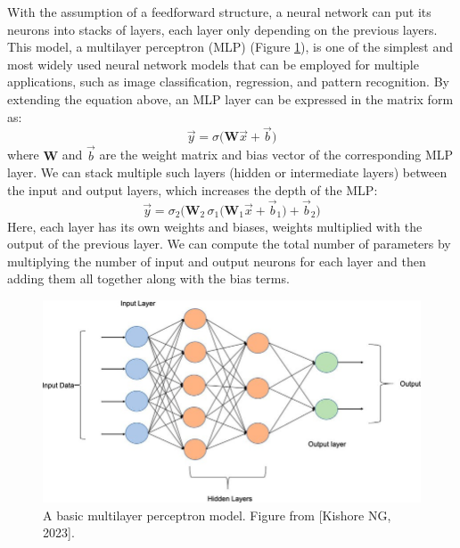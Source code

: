 With the assumption of a feedforward structure, a neural network can put its neurons into stacks of layers, each layer only depending on the previous layers. This model, a multilayer perceptron (\gls{MLP}) (Figure \ref{fig:mlp}), is one of the simplest and most widely used neural network models that can be employed for multiple applications, such as image classification, regression, and pattern recognition. By extending the equation above, an \gls{MLP} layer can be expressed in the matrix form as:
\begin{equation}
\vec{y} = \sigma \biggl(\mathbf{W}\vec{x} + \vec{b} \biggr)
\end{equation}
where $\mathbf{W}$ and $\vec{b}$ are the weight matrix and bias vector of the corresponding \gls{MLP} layer. We can stack multiple such layers (hidden or intermediate layers) between the input and output layers, which increases the depth of the MLP:
\begin{equation}
\vec{y} = \sigma_2 \biggl( \mathbf{W}_2 \,\sigma_1 \biggl(\mathbf{W}_1\vec{x} + \vec{b}_1 \biggr) + \vec{b}_2\biggr) 
\end{equation}
Here, each layer has its own weights and biases, weights multiplied with the output of the previous layer. We can compute the total number of parameters by multiplying the number of input and output neurons for each layer and then adding them all together along with the bias terms. 



\begin{figure}[ht]
  \centering
   \includegraphics[width=\linewidth]{Images/MLP.jpeg}
   \caption{A basic multilayer perceptron model. Figure from [Kishore NG, 2023].}
   \label{fig:mlp}
\end{figure}

